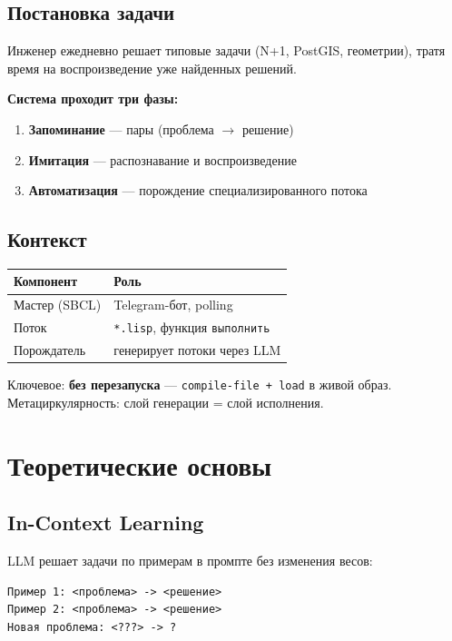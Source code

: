 \documentclass[10pt, oneside]{article}
\begin{document}
\subsection{Постановка задачи}

Инженер ежедневно решает типовые задачи (N+1, PostGIS, геометрии),
тратя время на воспроизведение уже найденных решений.

\textbf{Система проходит три фазы:}
\begin{enumerate}
  \item \textbf{Запоминание} --- пары (проблема $\to$ решение)
  \item \textbf{Имитация} --- распознавание и воспроизведение
  \item \textbf{Автоматизация} --- порождение специализированного потока
\end{enumerate}

\subsection{Контекст}

\begin{tabular}{@{}ll@{}}
  \toprule
  \textbf{Компонент} & \textbf{Роль} \\
  \midrule
  Мастер (SBCL) & Telegram-бот, polling \\
  Поток & \texttt{*.lisp}, функция \texttt{выполнить} \\
  Порождатель & генерирует потоки через LLM \\
  \bottomrule
\end{tabular}

\vspace{3pt}

Ключевое: \textbf{без перезапуска} --- \texttt{compile-file + load}
в живой образ. Метациркулярность: слой генерации = слой исполнения.

\section{Теоретические основы}

\subsection{In-Context Learning}

LLM решает задачи по примерам в промпте без изменения весов:

\begin{lstlisting}[language={},numbers=none,caption={ICL-промпт}]
Пример 1: <проблема> -> <решение>
Пример 2: <проблема> -> <решение>
Новая проблема: <???> -> ?
\end{lstlisting}
\end{document}
